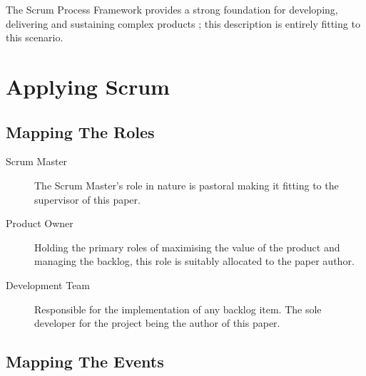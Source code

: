 The Scrum Process Framework provides a strong foundation for developing, delivering and sustaining complex products \parencite{schwaber2017definitive}; this description is entirely fitting to this scenario.


\section{Applying Scrum}

\subsection{Mapping The Roles}

\begin{description}
	\item[Scrum Master] The Scrum Master's role in nature is pastoral making it fitting to the supervisor of this paper.
	
	\item[Product Owner] Holding the primary roles of maximising the value of the product and managing the backlog, this role is suitably allocated to the paper author.
	
	\item[Development Team] Responsible for the implementation of any backlog item. The sole developer for the project being the author of this paper.
\end{description}

\subsection{Mapping The Events}

